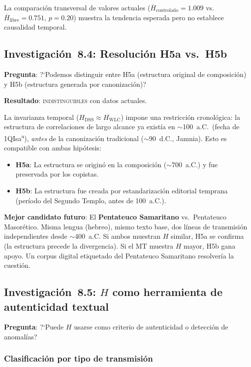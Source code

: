 \documentclass[12pt,a4paper]{article}
\begin{document}
La comparaci\'on transversal de valores actuales ($\overline{H}_{\text{controlado}} = 1.009$
vs.\ $\overline{H}_{\text{libre}} = 0.751$, $p = 0.20$) muestra la tendencia esperada
pero no establece causalidad temporal.

\subsection{Investigaci\'on~8.4: Resoluci\'on H5a vs.\ H5b}

\noindent\textbf{Pregunta}: ?`Podemos distinguir entre H5a (estructura original de composici\'on)
y H5b (estructura generada por canonizaci\'on)?

\noindent\textbf{Resultado}: \textsc{indistinguibles} con datos actuales.

La invarianza temporal ($H_{\text{DSS}} \approx H_{\text{WLC}}$) impone una
restricci\'on cronol\'ogica: la estructura de correlaciones de largo alcance
ya exist\'ia en $\sim$100~a.C.\ (fecha de 1QIsa\textsuperscript{a}), \emph{antes}
de la canonizaci\'on tradicional ($\sim$90~d.C., Jamnia). Esto es compatible
con ambas hip\'otesis:
\begin{itemize}[leftmargin=2em]
\item \textbf{H5a}: La estructura se origin\'o en la composici\'on ($\sim$700~a.C.)
      y fue preservada por los copistas.
\item \textbf{H5b}: La estructura fue creada por estandarizaci\'on editorial temprana
      (per\'iodo del Segundo Templo, antes de 100~a.C.).
\end{itemize}

\noindent
\textbf{Mejor candidato futuro}: El \textbf{Pentateuco Samaritano} vs.\ Pentateuco
Masor\'etico. Misma lengua (hebreo), mismo texto base, dos l\'ineas de transmisi\'on
independientes desde $\sim$400~a.C. Si ambos muestran $H$ similar, H5a se confirma
(la estructura precede la divergencia). Si el MT muestra $H$ mayor, H5b gana apoyo.
Un corpus digital etiquetado del Pentateuco Samaritano resolver\'ia la cuesti\'on.

\subsection{Investigaci\'on~8.5: $H$ como herramienta de autenticidad textual}

\noindent\textbf{Pregunta}: ?`Puede $H$ usarse como criterio de autenticidad o detecci\'on
de anomal\'ias?

\subsubsection{Clasificaci\'on por tipo de transmisi\'on}
\end{document}
